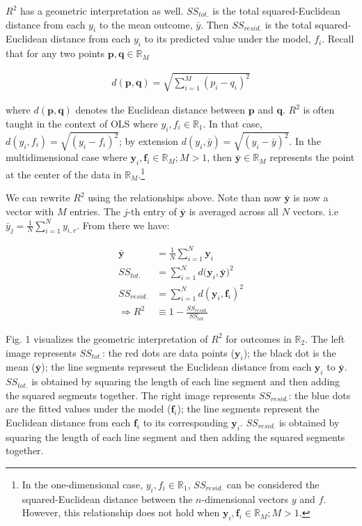 \documentclass[conference,final,]{IEEEtran}
\begin{document}
\(R^2\) has a geometric interpretation as well. \(SS_{tot.}\) is the
total squared-Euclidean distance from each \(y_i\) to the mean outcome,
\(\bar{y}\). Then \(SS_{resid.}\) is the total squared-Euclidean
distance from each \(y_i\) to its predicted value under the model,
\(f_i\). Recall that for any two points
\(\mathbf{p}, \mathbf{q} \in \mathbb{R}_M\)

\begin{align}
    d(\mathbf{p},\mathbf{q}) = \sqrt{\sum_{i=1}^M{(p_i - q_i)^2}}
\end{align}

where \(d(\mathbf{p}, \mathbf{q})\) denotes the Euclidean distance
between \(\mathbf{p}\) and \(\mathbf{q}\). \(R^2\) is often taught in
the context of OLS where \(y_i, f_i \in \mathbb{R}_1\). In that case,
\(d(y_i, f_i) = \sqrt{(y_i - f_i)^2}\); by extension
\(d(y_i, \bar{y}) = \sqrt{(y_i - \bar{y})^2}\). In the multidimensional
case where \(\mathbf{y}_i, \mathbf{f}_i \in \mathbb{R}_M; M > 1\), then
\(\bar{\mathbf{y}} \in \mathbb{R}_M\) represents the point at the center
of the data in \(\mathbb{R}_M\).\footnote{In the one-dimensional case,
  \(y_i , f_i \in \mathbb{R}_1\), \(SS_{resid.}\) can be considered the
  squared-Euclidean distance between the \(n\)-dimensional vectors \(y\)
  and \(f\). However, this relationship does not hold when
  \(\mathbf{y}_i , \mathbf{f}_i \in \mathbb{R}_M ; M > 1\).}

We can rewrite \(R^2\) using the relationships above. Note than now
\(\bar{\mathbf{y}}\) is now a vector with \(M\) entries. The \(j\)-th
entry of \(\bar{\mathbf{y}}\) is averaged across all \(N\) vectors. i.e
\(\bar{y}_j = \frac{1}{N} \sum_{i=1}^{N} y_{i,v}\). From there we have:

\begin{align}
    \bar{\mathbf{y}} &= \frac{1}{N} \sum_{i=1}^{N} \mathbf{y}_i \\ 
    SS_{tot.} &= \sum_{i=1}^N{d(\mathbf{y}_i, \bar{\mathbf{y}}})^2\\
    SS_{resid.} &= \sum_{i=1}^N{d(\mathbf{y}_i, \mathbf{f}_i)^2}\\
    \Rightarrow R^2 & \equiv 1 - \frac{SS_{resid.}}{SS_{tot.}}
\end{align}

Fig. 1 visualizes the geometric interpretation of \(R^2\) for outcomes
in \(\mathbb{R}_2\). The left image represents \(SS_{tot.}\): the red
dots are data points (\(\mathbf{y}_i\)); the black dot is the mean
(\(\bar{\mathbf{y}}\)); the line segments represent the Euclidean
distance from each \(\mathbf{y}_i\) to \(\bar{\mathbf{y}}\).
\(SS_{tot.}\) is obtained by squaring the length of each line segment
and then adding the squared segments together. The right image
represents \(SS_{resid.}\): the blue dots are the fitted values under
the model (\(\mathbf{f}_i\)); the line segments represent the Euclidean
distance from each \(\mathbf{f}_i\) to its corresponding
\(\mathbf{y}_i\). \(SS_{resid.}\) is obtained by squaring the length of
each line segment and then adding the squared segments together.
\end{document}
